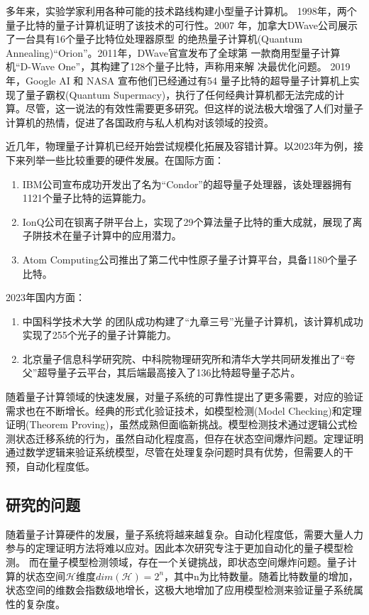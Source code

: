 多年来，实验学家利用各种可能的技术路线构建小型量子计算机。 1998年，两个量子比特的量子计算机证明了该技术的可行性\citep{chuang1998experimental}。2007
年，加拿大DWave公司展示了一台具有16个量子比特位处理器原型
的绝热量子计算机(Quantum Annealing)“Orion”。2011年，DWave官宣发布了全球第
一款商用型量子计算机“D-Wave One”，其构建了128个量子比特，声称用来解
决最优化问题。
2019 年，Google AI 和 NASA 宣布他们已经通过有54 量子比特的超导量子计算机上实现了量子霸权(Quantum Supermacy)，执行了任何经典计算机都无法完成的计算\citep{arute2019quantum}。尽管，这一说法的有效性需要更多研究\citep{pednault2019quantum}。但这样的说法极大增强了人们对量子计算机的热情，促进了各国政府与私人机构对该领域的投资。

近几年，物理量子计算机已经开始尝试规模化拓展及容错计算。以2023年为例，接下来列举一些比较重要的硬件发展。在国际方面：
\begin{enumerate}
    \item IBM公司宣布成功开发出了名为“Condor”的超导量子处理器，该处理器拥有1121个量子比特的运算能力\citep{condor}。
    \item IonQ公司在钡离子阱平台上，实现了29个算法量子比特的重大成就，展现了离子阱技术在量子计算中的应用潜力\citep{chen2023benchmarking}。
    \item Atom Computing公司推出了第二代中性原子量子计算平台，具备1180个量子比特\citep{AtomComputing2023}。
\end{enumerate}
2023年国内方面：
\begin{enumerate}
    \item 中国科学技术大学 的团队成功构建了“九章三号”光量子计算机，该计算机成功实现了255个光子的量子计算能力\citep{deng2023gaussian}。
    \item 北京量子信息科学研究院、中科院物理研究所和清华大学共同研发推出了“夸父”超导量子云平台，其后端最高接入了136比特超导量子芯片\citep{QuantumCloudPlatform2023}。
\end{enumerate}

随着量子计算领域的快速发展，对量子系统的可靠性提出了更多需要，对应的验证需求也在不断增长。经典的形式化验证技术，如模型检测(Model Checking)和定理证明(Theorem Proving)，虽然成熟但面临新挑战。模型检测技术通过逻辑公式检测状态迁移系统的行为，虽然自动化程度高，但存在状态空间爆炸问题。定理证明通过数学逻辑来验证系统模型，尽管在处理复杂问题时具有优势，但需要人的干预，自动化程度低。
\subsection{研究的问题}
随着量子计算硬件的发展，量子系统将越来越复杂。自动化程度低，需要大量人力参与的定理证明方法将难以应对。因此本次研究专注于更加自动化的量子模型检测。
而在量子模型检测领域，存在一个关键挑战，即状态空间爆炸问题。量子计算的状态空间\(\mathcal{H}\)维度\(dim\left(\mathcal{H}\right)=2^n\)，其中n为比特数量。随着比特数量的增加，状态空间的维数会指数级地增长，这极大地增加了应用模型检测来验证量子系统属性的复杂度。

